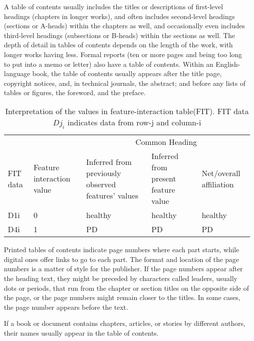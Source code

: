 \documentclass{IEEEtran}
\begin{document}
A table of contents usually includes the titles or descriptions of first-level headings (chapters in longer works), and often includes second-level headings (sections or A-heads) within the chapters as well, and occasionally even includes third-level headings (subsections or B-heads) within the sections as well. The depth of detail in tables of contents depends on the length of the work, with longer works having less. Formal reports (ten or more pages and being too long to put into a memo or letter) also have a table of contents. Within an English-language book, the table of contents usually appears after the title page, copyright notices, and, in technical journals, the abstract; and before any lists of tables or figures, the foreword, and the preface.


\begin{table*}[h]
\caption{Interpretation of the values in feature-interaction table(FIT). FIT data $Dj_i$ indicates data from row-j and column-i}
			\centering	 
				{\begin{tabular} {| p{0.4in} | p{0.6in} | p{1in} | p{1in} | p{0.7in} | }\hline
				& &\multicolumn{3}{|c|}{Common Heading} \\ \cline{3-5}
				FIT data & Feature interaction value & Inferred from previously observed features' values &Inferred from present feature value & Net/overall affiliation\\ \hline
				D1i & 0& healthy & healthy & healthy\\ %
				D4i & 1&PD & PD & PD\\ \hline
				\end{tabular}
			}
		\label{table2}
	\end{table*}





Printed tables of contents indicate page numbers where each part starts, while digital ones offer links to go to each part. The format and location of the page numbers is a matter of style for the publisher. If the page numbers appear after the heading text, they might be preceded by characters called leaders, usually dots or periods, that run from the chapter or section titles on the opposite side of the page, or the page numbers might remain closer to the titles. In some cases, the page number appears before the text.

If a book or document contains chapters, articles, or stories by different authors, their names usually appear in the table of contents.
\end{document}
